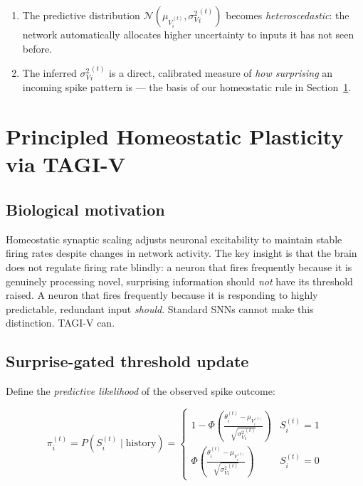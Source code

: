 \documentclass[12pt, a4paper]{article}
\newcommand{\Normal}{\mathcal{N}}
\newcommand{\mV}{\mu_{V}}
\newcommand{\sV}{\sigma^{2}_{V}}
\begin{document}
\begin{enumerate}
    \item The predictive distribution $\Normal(\mV_i^{(t)}, \sV_i^{(t)})$ becomes
    \emph{heteroscedastic}: the network automatically allocates higher uncertainty to
    inputs it has not seen before.

    \item The inferred $\sV_i^{(t)}$ is a direct, calibrated measure of \emph{how
    surprising} an incoming spike pattern is --- the basis of our homeostatic rule in
    Section~\ref{sec:homeostasis}.
\end{enumerate}

\section{Principled Homeostatic Plasticity via TAGI-V}
\label{sec:homeostasis}

\subsection{Biological motivation}

Homeostatic synaptic scaling \citep{turrigiano1999homeostatic} adjusts neuronal
excitability to maintain stable firing rates despite changes in network activity. The key
insight is that the brain does not regulate firing rate blindly: a neuron that fires
frequently because it is genuinely processing novel, surprising information should
\emph{not} have its threshold raised. A neuron that fires frequently because it is
responding to highly predictable, redundant input \emph{should}. Standard SNNs cannot
make this distinction. TAGI-V can.

\subsection{Surprise-gated threshold update}

Define the \emph{predictive likelihood} of the observed spike outcome:

\begin{equation}
    \pi_i^{(t)} = P\!\left(S_i^{(t)} \mid \text{history}\right)
    = \begin{cases}
        1 - \Phi\!\left(\frac{\theta_i^{(t)} - \mV_i^{(t)}}{\sqrt{\sV_i^{(t)}}}\right)
        & S_i^{(t)} = 1 \\[6pt]
        \Phi\!\left(\frac{\theta_i^{(t)} - \mV_i^{(t)}}{\sqrt{\sV_i^{(t)}}}\right)
        & S_i^{(t)} = 0
    \end{cases}
    \label{eq:likelihood}
\end{equation}
\end{document}
